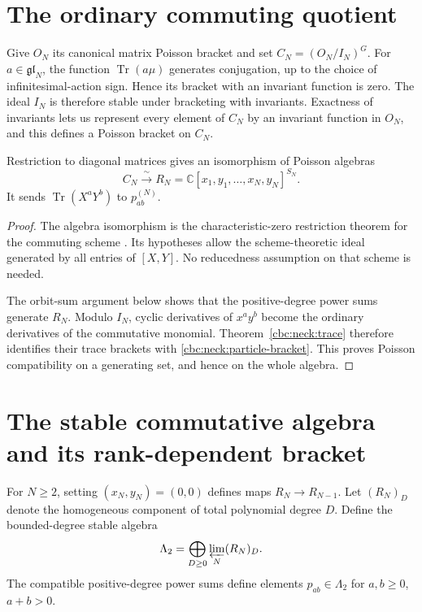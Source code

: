 \section{The ordinary commuting quotient}
Give $O_N$ its canonical matrix Poisson bracket and set
$C_N=(O_N/I_N)^G$.  For $a\in\mathfrak{gl}_N$, the function
$\operatorname{Tr}(a\mu)$ generates conjugation, up to the choice of
infinitesimal-action sign.  Hence its bracket with an invariant function is
zero.  The ideal $I_N$ is therefore stable under bracketing with invariants.
Exactness of invariants lets us represent every element of $C_N$ by an
invariant function in $O_N$, and this defines a Poisson bracket on $C_N$.

\begin{theorem}\label{cbc:neck:diagonal}
Restriction to diagonal matrices gives an isomorphism of Poisson algebras
\[
 C_N\xrightarrow{\ \sim\ }
 R_N=\mathbb C[x_1,y_1,\ldots,x_N,y_N]^{S_N}.
\]
It sends $\operatorname{Tr}(X^aY^b)$ to $p_{ab}^{(N)}$.
\end{theorem}
\begin{proof}
The algebra isomorphism is the characteristic-zero restriction theorem for
the commuting scheme \cite[Theorem~3]{VaccarinoCommuting}.  Its hypotheses
allow the scheme-theoretic ideal generated by all entries of $[X,Y]$.
No reducedness assumption on that scheme is needed.

The orbit-sum argument below shows that the positive-degree power sums
generate $R_N$.  Modulo $I_N$, cyclic derivatives of $x^ay^b$ become the ordinary
derivatives of the commutative monomial.  Theorem~\ref{cbc:neck:trace} therefore
identifies their trace brackets with
\eqref{cbc:neck:particle-bracket}.  This proves Poisson compatibility on a
generating set, and hence on the whole algebra.
\end{proof}

\section{The stable commutative algebra and its rank-dependent bracket}
For $N\geq2$, setting $(x_N,y_N)=(0,0)$ defines maps $R_N\to R_{N-1}$.
Let $(R_N)_D$ denote the homogeneous component of total polynomial degree
$D$.  Define the bounded-degree stable algebra
\[
 \Lambda_2=\bigoplus_{D\geq0}\varprojlim_N(R_N)_D.
\]
The compatible positive-degree power sums define elements $p_{ab}\in\Lambda_2$
for $a,b\geq0$, $a+b>0$.

